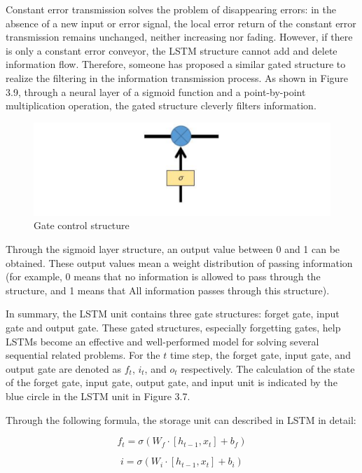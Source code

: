 Constant error transmission solves the problem of disappearing errors: in the absence of a new input or error signal, the local error return of the constant error transmission remains unchanged, neither increasing nor fading. However, if there is only a constant error conveyor, the LSTM structure cannot add and delete information flow. Therefore, someone has proposed a similar gated structure to realize the filtering in the information transmission process. 
As shown in Figure 3.9, through a neural layer of a sigmoid function and a point-by-point multiplication operation, the gated structure cleverly filters information.
\begin{figure}[h]
	\centering
	\includegraphics[width=1.0\textwidth]{gate.png}
	\caption{Gate control structure}
\end{figure}

Through the sigmoid layer structure,  an output value between 0 and 1 can be obtained. These output values mean a weight distribution of passing information (for example, 0 means that no information is allowed to pass through the structure, and 1 means that All information passes through this structure).

In summary, the LSTM unit contains three gate structures: forget gate, input gate and output gate. These gated structures, especially forgetting gates, help LSTMs become an effective and well-performed model for solving several sequential related problems. 
For the $t$ time step, the forget gate, input gate, and output gate are denoted as $f_{t}$, $i_{t}$, and $o_{t}$ respectively. The calculation of the state of the forget gate, input gate, output gate, and input unit is indicated by the blue circle in the LSTM unit in Figure 3.7.

Through the following formula, the storage unit can described  in LSTM in detail:

\begin{equation}
	f_{t}=\sigma (W_{f}\cdot[h_{t-1},x_{t}] + b_{f})
\end{equation}	

\begin{equation}
	i=\sigma (W_{i}\cdot[h_{t-1},x_{t}] + b_{i})
\end{equation}	

